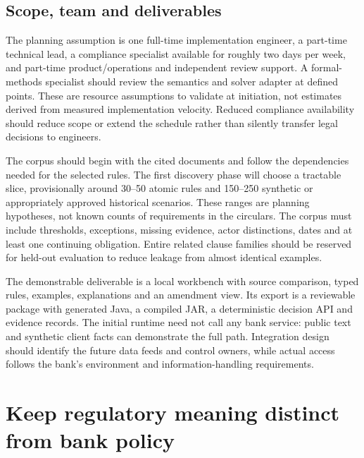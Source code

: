 \subsection{Scope, team and deliverables}
\label{merge:P-04-prototype:01}


The planning assumption is one full-time implementation engineer, a part-time
technical lead, a compliance specialist available for roughly two days per week, and
part-time product/operations and independent review support. A formal-methods
specialist should review the semantics and solver adapter at defined points.
These are resource assumptions to validate at initiation, not estimates derived
from measured implementation velocity. Reduced compliance availability should
reduce scope or extend the schedule rather than silently transfer legal decisions
to engineers.

The corpus should begin with the cited documents and follow the dependencies
needed for the selected rules. The first discovery phase will choose a tractable
slice, provisionally around 30--50 atomic rules and 150--250 synthetic or
appropriately approved historical scenarios. These ranges are planning hypotheses,
not known counts of requirements in the circulars. The corpus must include
thresholds, exceptions, missing evidence, actor distinctions, dates and at least
one continuing obligation. Entire related clause families should be reserved for
held-out evaluation to reduce leakage from almost identical examples.


The demonstrable deliverable is a local workbench with source comparison, typed
rules, examples, explanations and an amendment view. Its export is a reviewable
package with generated Java, a compiled JAR, a deterministic decision API and
evidence records. The initial runtime need not call any bank service: public text and synthetic client facts
can demonstrate the full path. Integration design should identify the future
data feeds and control owners, while actual access follows the bank's environment
and information-handling requirements.

\section{Keep regulatory meaning distinct from bank policy}
\label{merge:M10:02}


